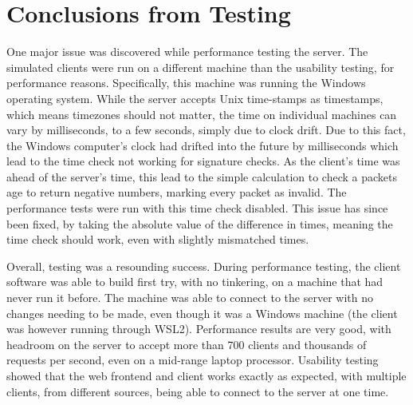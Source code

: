 \section{Conclusions from Testing}
One major issue was discovered while performance testing the server. The simulated clients were run on a different machine than the usability testing, for performance reasons. Specifically, this machine was running the Windows operating system. While the server accepts Unix time-stamps as timestamps, which means timezones should not matter, the time on individual machines can vary by milliseconds, to a few seconds, simply due to clock drift. Due to this fact, the Windows computer's clock had drifted into the future by milliseconds which lead to the time check not working for signature checks. As the client's time was ahead of the server's time, this lead to the simple calculation to check a packets age to return negative numbers, marking every packet as invalid. The performance tests were run with this time check disabled. This issue has since been fixed, by taking the absolute value of the difference in times, meaning the time check should work, even with slightly mismatched times.

Overall, testing was a resounding success. During performance testing, the client software was able to build first try, with no tinkering, on a machine that had never run it before. The machine was able to connect to the server with no changes needing to be made, even though it was a Windows machine (the client was however running through WSL2). Performance results are very good, with headroom on the server to accept more than 700 clients and thousands of requests per second, even on a mid-range laptop processor. Usability testing showed that the web frontend and client works exactly as expected, with multiple clients, from different sources, being able to connect to the server at one time.
